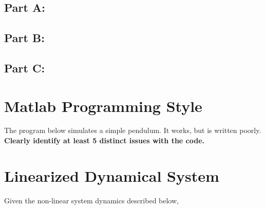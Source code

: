 

\subsection*{Part A:}
\vspace{7em}
\subsection*{Part B:}
\vspace{9em}
\subsection*{Part C: }
\vspace{11em}



\pagebreak
\section{Matlab Programming Style}
The program below simulates a simple pendulum. It works, but is written poorly. \\
\textbf{Clearly identify at least 5 distinct issues with the code.}

\lstset{stepnumber=1}


\vspace{30em}




\pagebreak
\section{Linearized Dynamical System}

Given the non-linear system dynamics described below,

